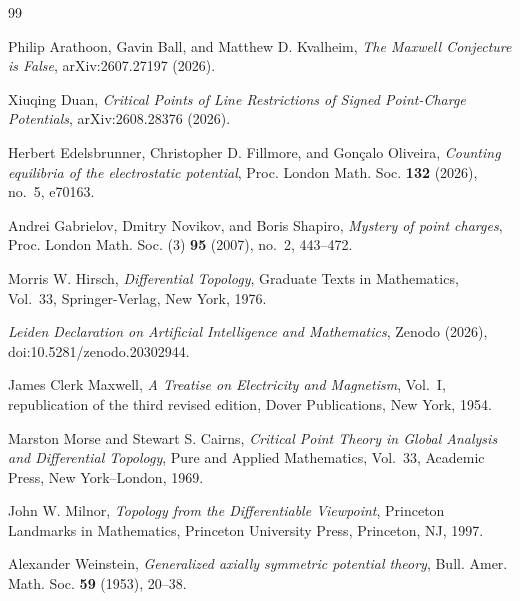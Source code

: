 \documentclass[leqno,11pt]{amsart}
\numberwithin{equation}{section}
\theoremstyle{definition}
\begin{document}
	
	\begin{thebibliography}{99}
		
		Philip Arathoon, Gavin Ball, and Matthew D. Kvalheim,
		\textit{The Maxwell Conjecture is False},
		arXiv:2607.27197 (2026).
		
		Xiuqing Duan,
		\textit{Critical Points of Line Restrictions of Signed Point-Charge Potentials},
		arXiv:2608.28376 (2026).
		
		Herbert Edelsbrunner, Christopher D. Fillmore, and Gon\c{c}alo Oliveira,
		\textit{Counting equilibria of the electrostatic potential},
		Proc. London Math. Soc. \textbf{132} (2026), no.~5, e70163.
		
		Andrei Gabrielov, Dmitry Novikov, and Boris Shapiro,
		\textit{Mystery of point charges},
		Proc. London Math. Soc. (3) \textbf{95} (2007), no.~2, 443--472.
		
		Morris W. Hirsch,
		\textit{Differential Topology},
		Graduate Texts in Mathematics, Vol.~33,
		Springer-Verlag, New York, 1976.
		
		
		\textit{Leiden Declaration on Artificial Intelligence and Mathematics},
		Zenodo (2026), doi:10.5281/zenodo.20302944.
		
		James Clerk Maxwell,
		\textit{A Treatise on Electricity and Magnetism}, Vol.~I,
		republication of the third revised edition, Dover Publications, New York, 1954.
		
		Marston Morse and Stewart S. Cairns,
		\textit{Critical Point Theory in Global Analysis and Differential Topology},
		Pure and Applied Mathematics, Vol.~33, Academic Press, New York--London, 1969.
		
		John W. Milnor,
		\textit{Topology from the Differentiable Viewpoint},
		Princeton Landmarks in Mathematics, Princeton University Press, Princeton, NJ, 1997.
		
		Alexander Weinstein,
		\textit{Generalized axially symmetric potential theory},
		Bull. Amer. Math. Soc. \textbf{59} (1953), 20--38.
		
	\end{thebibliography}
	
\end{document}
